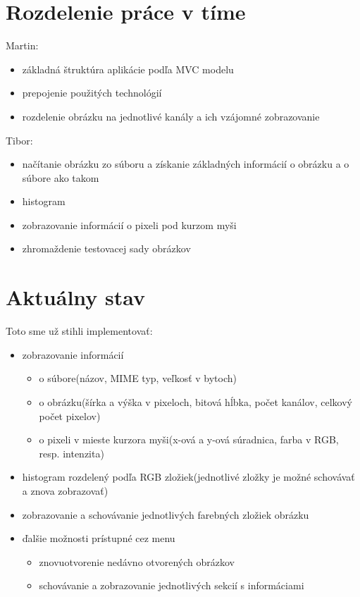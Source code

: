 \documentclass[12pt,a4paper,titlepage,final]{article}
\begin{document}
\section{Rozdelenie práce v tíme}
Martin:
\begin{itemize}
	\item základná štruktúra aplikácie podľa MVC modelu
	\item prepojenie použitých technológií
	\item rozdelenie obrázku na jednotlivé kanály a ich vzájomné zobrazovanie
\end{itemize}
Tibor:
\begin{itemize}
	\item načítanie obrázku zo súboru a získanie základných informácií o obrázku a o súbore ako takom
	\item histogram
	\item zobrazovanie informácií o pixeli pod kurzom myši
	\item zhromaždenie testovacej sady obrázkov
\end{itemize}

\section{Aktuálny stav}
Toto sme už stihli implementovať:
\begin{itemize}
	\item zobrazovanie informácií
		\begin{itemize}
			\item o súbore(názov, MIME typ, veľkosť v bytoch)
			\item o obrázku(šírka a výška v pixeloch, bitová hĺbka, počet kanálov, celkový počet pixelov)
			\item o pixeli v mieste kurzora myši(x-ová a y-ová súradnica, farba v RGB, resp. intenzita)
		\end{itemize}
	\item histogram rozdelený podľa RGB zložiek(jednotlivé zložky je možné schovávať a znova zobrazovať)
	\item zobrazovanie a schovávanie jednotlivých farebných zložiek obrázku
	\item ďalšie možnosti prístupné cez menu
		\begin{itemize}
		\item znovuotvorenie nedávno otvorených obrázkov
		\item schovávanie a zobrazovanie jednotlivých sekcií s informáciami 
		\end{itemize}
	
\end{itemize}
\end{document}
